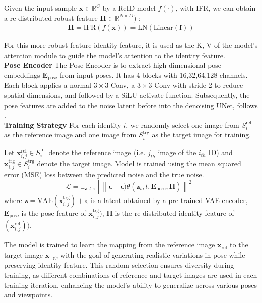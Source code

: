 Given the input sample $\mathbf{x} \in \mathbb{R}^{C}$ by a ReID model \( f(\cdot) \), with IFR, we can obtain a re-distributed robust feature $\mathbf{H}\in \mathbb{R}^{N \times D})$ :
\begin{gather}
\mathbf{H} = \text{IFR}(f(\mathbf{x})) = \text{LN}(\text{Linear}(\mathbf{f}))
\end{gather}

For this more robust feature identity feature, it is used as the K, V of the model's attention module to guide the model's attention to the identity feature.
\\
\textbf{Pose Encoder}
The Pose Encoder is to extract high-dimensional pose embeddings $\mathbf{E}_{\text{pose}}$ from input poses. It has 4 blocks with 16,32,64,128 channels. Each block applies a normal \(3 \times 3\) Conv, a \(3 \times 3\) Conv with stride 2 to reduce spatial dimensions, and followed by a SiLU activate function. Subsequently, the pose features are added to the noise latent before into the denoising UNet, follows \cite{hu2024animate}.
\\
\textbf{Training Strategy}
For each identity $i$, we randomly select one image from \( S_i^{\text{ref}} \) as the reference image and one image from \( S_i^{\text{trg}} \) as the target image for training.

Let \( \mathbf{x}_{i,j}^{\text{ref}} \in S_i^{\text{ref}} \) denote the reference image (i.e. $j_{th}$ image of the $i_{th}$ ID) and \( \mathbf{x}_{i,j}^{\text{trg}} \in S_i^{\text{trg}} \) denote the target image. Model is trained using the mean squared error (MSE) loss between the predicted noise and the true noise.
\begin{equation}
\mathcal{L} = \mathbb{E}_{\mathbf{z}, t, \boldsymbol{\epsilon}} \left[ \left\| \boldsymbol{\epsilon} - \boldsymbol{\epsilon})\theta(\mathbf{z}_t, t, \mathbf{E}_{\text{pose}}, \mathbf{H}) \right\|^2 \right]
\end{equation}
where $\mathbf{z}=\text{VAE}(\mathbf{x}^{\text{trg}}_{i,j})+\boldsymbol{\epsilon}$ is a latent obtained by a pre-trained VAE encoder\cite{kingma2013auto}, $\mathbf{E}_{\text{pose}}$ is the pose feature of $\mathbf{x}^{\text{trg}}_{i,j})$, $\mathbf{H}$ is the re-distributed identity feature of $(\mathbf{x}^{\text{ref}}_{i,j}))$.

The model is trained to learn the mapping from the reference image \( \mathbf{x}_{\text{ref}} \) to the target image \( \mathbf{x}_{\text{trg}} \), with the goal of generating realistic variations in pose while preserving identity feature. This random selection ensures diversity during training, as different combinations of reference and target images are used in each training iteration, enhancing the model’s ability to generalize across various poses and viewpoints.


